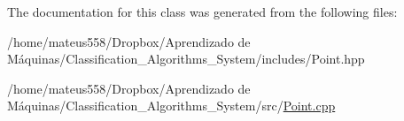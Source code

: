 The documentation for this class was generated from the following files\+:\begin{DoxyCompactItemize}
\item 
/home/mateus558/\+Dropbox/\+Aprendizado de Máquinas/\+Classification\+\_\+\+Algorithms\+\_\+\+System/includes/Point.\+hpp\item 
/home/mateus558/\+Dropbox/\+Aprendizado de Máquinas/\+Classification\+\_\+\+Algorithms\+\_\+\+System/src/\hyperlink{_point_8cpp}{Point.\+cpp}\end{DoxyCompactItemize}
